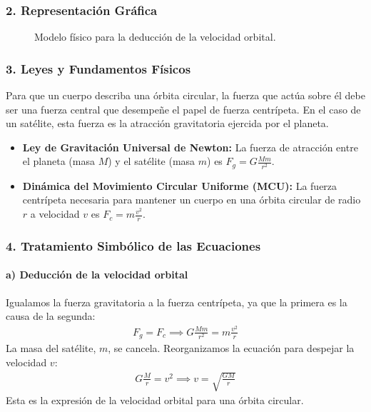 \subsubsection*{2. Representación Gráfica}
\begin{figure}[H]
    \centering
    \caption{Modelo físico para la deducción de la velocidad orbital.}
\end{figure}

\subsubsection*{3. Leyes y Fundamentos Físicos}
Para que un cuerpo describa una órbita circular, la fuerza que actúa sobre él debe ser una fuerza central que desempeñe el papel de fuerza centrípeta. En el caso de un satélite, esta fuerza es la atracción gravitatoria ejercida por el planeta.
\begin{itemize}
    \item \textbf{Ley de Gravitación Universal de Newton:} La fuerza de atracción entre el planeta (masa $M$) y el satélite (masa $m$) es $F_g = G \frac{M m}{r^2}$.
    \item \textbf{Dinámica del Movimiento Circular Uniforme (MCU):} La fuerza centrípeta necesaria para mantener un cuerpo en una órbita circular de radio $r$ a velocidad $v$ es $F_c = m \frac{v^2}{r}$.
\end{itemize}

\subsubsection*{4. Tratamiento Simbólico de las Ecuaciones}
\paragraph{a) Deducción de la velocidad orbital}
Igualamos la fuerza gravitatoria a la fuerza centrípeta, ya que la primera es la causa de la segunda:
\begin{gather}
    F_g = F_c \implies G \frac{M m}{r^2} = m \frac{v^2}{r}
\end{gather}
La masa del satélite, $m$, se cancela. Reorganizamos la ecuación para despejar la velocidad $v$:
\begin{gather}
    G \frac{M}{r} = v^2 \implies v = \sqrt{\frac{GM}{r}}
\end{gather}
Esta es la expresión de la velocidad orbital para una órbita circular.

